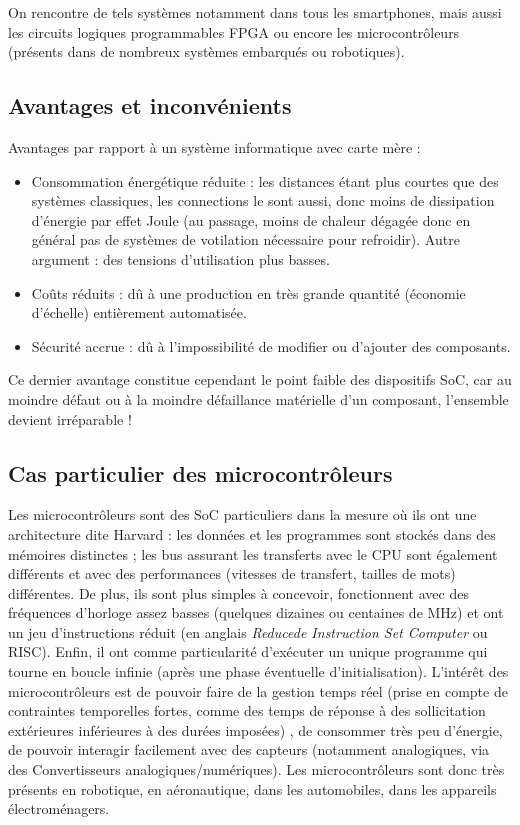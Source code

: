 \documentclass[11pt,a4paper,french,twoside]{PMCours}
\begin{document}
On rencontre de tels systèmes notamment dans tous les smartphones, mais aussi les circuits logiques programmables FPGA ou encore les microcontrôleurs (présents dans de nombreux systèmes embarqués ou robotiques). 

\subsection{Avantages et inconvénients}

Avantages par rapport à un système informatique avec carte mère : 
\begin{itemize}
 \item Consommation énergétique réduite : les distances étant plus courtes que des systèmes classiques, les connections le sont aussi, donc moins de dissipation d'énergie par effet Joule (au passage, moins de chaleur dégagée donc en général pas de systèmes de votilation nécessaire pour refroidir). Autre argument : des tensions d'utilisation plus basses.
 \item Coûts réduits : dû à une production en très grande quantité (économie d'échelle) entièrement automatisée.
 \item Sécurité accrue : dû à l'impossibilité de modifier ou d'ajouter des composants.
\end{itemize}

Ce dernier avantage constitue cependant le point faible des dispositifs SoC, car au moindre défaut ou à la moindre défaillance matérielle d'un composant, l'ensemble devient irréparable !

\subsection{Cas particulier des microcontrôleurs}

Les microcontrôleurs sont des SoC particuliers dans la mesure où ils ont une architecture dite Harvard : les données et les programmes sont stockés dans des mémoires distinctes ; les bus assurant les transferts avec le CPU sont également différents et avec des performances (vitesses de transfert, tailles de mots) différentes. De plus, ils sont plus simples à concevoir, fonctionnent avec des fréquences d'horloge assez basses (quelques dizaines ou centaines de MHz) et ont un jeu d'instructions réduit (en anglais \emph{Reducede Instruction Set Computer} ou RISC). Enfin, il ont comme particularité d'exécuter un unique programme qui tourne en boucle infinie (après une phase éventuelle d'initialisation). L'intérêt des microcontrôleurs est de pouvoir faire de la gestion temps réel (prise en compte de contraintes temporelles fortes, comme des temps de réponse à des sollicitation extérieures inférieures à des durées imposées) , de consommer très peu d'énergie, de pouvoir interagir facilement avec des capteurs (notamment analogiques, via des Convertisseurs analogiques/numériques). Les microcontrôleurs sont donc très présents en robotique, en aéronautique, dans les automobiles, dans les appareils électroménagers. 
\end{document}
